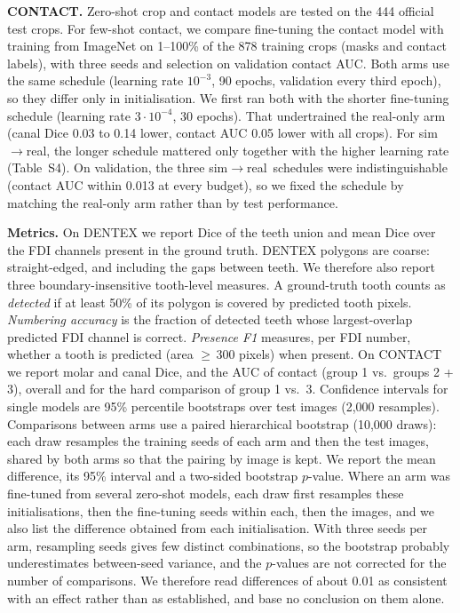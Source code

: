 \documentclass[preprint,12pt]{elsarticle}
\newcommand{\sr}{sim$\to$real}
\begin{document}
\textbf{CONTACT.} Zero-shot crop and contact models are tested on the 444 official test crops. For few-shot contact, we
compare fine-tuning the contact model with training from ImageNet on 1--100\% of the 878 training crops (masks and
contact labels), with three seeds and selection on validation contact AUC. Both arms use the same schedule (learning rate
$10^{-3}$, 90 epochs, validation every third epoch), so they differ only in initialisation. We first ran both with the
shorter fine-tuning schedule (learning rate $3\cdot10^{-4}$, 30 epochs). That undertrained the real-only arm (canal Dice
0.03 to 0.14 lower, contact AUC 0.05 lower with all crops). For \sr, the longer schedule mattered only together with the
higher learning rate (Table~S4). On validation, the three \sr\ schedules were indistinguishable (contact AUC
within 0.013 at every budget), so we fixed the schedule by matching the real-only arm rather than by test performance.

\textbf{Metrics.} On DENTEX we report Dice of the teeth union and mean Dice over the FDI channels present in the ground
truth. DENTEX polygons are coarse: straight-edged, and including the gaps between teeth. We therefore also report three
boundary-insensitive tooth-level measures. A ground-truth tooth counts as \emph{detected} if at least 50\% of its polygon
is covered by predicted tooth pixels. \emph{Numbering accuracy} is the fraction of detected teeth whose largest-overlap
predicted FDI channel is correct. \emph{Presence F1} measures, per FDI number, whether a tooth is predicted (area
$\geq$\,300 pixels) when present. On CONTACT we report molar and canal Dice, and the AUC of contact (group 1 vs.\ groups
2 + 3), overall and for the hard comparison of group 1 vs.\ 3. Confidence intervals for single models are 95\% percentile bootstraps over test images (2,000 resamples).
Comparisons between arms use a paired hierarchical bootstrap (10,000 draws): each draw resamples the training seeds of
each arm and then the test images, shared by both arms so that the pairing by image is kept. We report the mean
difference, its 95\% interval and a two-sided bootstrap $p$-value. Where an arm was fine-tuned from several zero-shot
models, each draw first resamples these initialisations, then the fine-tuning seeds within each, then the images, and we
also list the difference obtained from each initialisation. With three seeds per arm, resampling seeds gives few
distinct combinations, so the bootstrap probably underestimates between-seed variance, and the $p$-values are not
corrected for the number of comparisons. We therefore read differences of about 0.01 as consistent with an effect
rather than as established, and base no conclusion on them alone.
\end{document}
